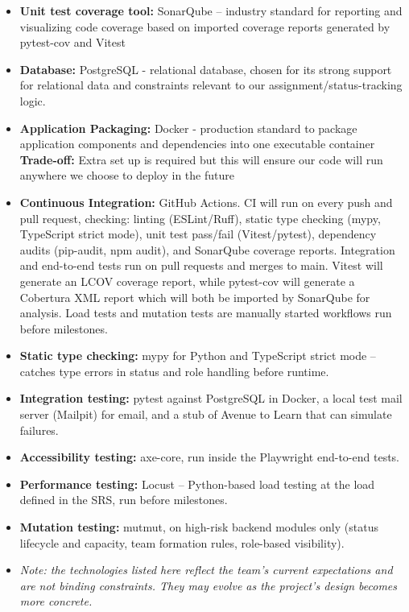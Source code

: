 \documentclass{article}
\begin{document}
\begin{itemize}
    \item \textbf{Unit test coverage tool:}  SonarQube -- industry standard for reporting and visualizing code coverage based on imported coverage reports generated by pytest-cov and Vitest
    \item \textbf{Database:} PostgreSQL - relational database, chosen for its strong support for relational data and constraints relevant to our assignment/status-tracking logic.
    \item \textbf{Application Packaging:} Docker - production standard to package application components and dependencies into one executable container \textbf{Trade-off:} Extra set up is required but this will ensure our code will run anywhere we choose to deploy in the future
    \item \textbf{Continuous Integration:} GitHub Actions. CI will run on every push and pull request, checking: linting (ESLint/Ruff), static type checking (mypy, TypeScript strict mode), unit test pass/fail (Vitest/pytest), dependency audits (pip-audit, npm audit), and SonarQube coverage reports. Integration and end-to-end tests run on pull requests and merges to main. Vitest will generate an LCOV coverage report, while pytest-cov will generate a Cobertura XML report which will both be imported by SonarQube for analysis. Load tests and mutation tests are manually started workflows run before milestones.
    \item \textbf{Static type checking:} mypy for Python and TypeScript strict mode -- catches type errors in status and role handling before runtime.
    \item \textbf{Integration testing:} pytest against PostgreSQL in Docker, a local test mail server (Mailpit) for email, and a stub of Avenue to Learn that can simulate failures.
    \item \textbf{Accessibility testing:} axe-core, run inside the Playwright end-to-end tests.
    \item \textbf{Performance testing:} Locust -- Python-based load testing at the load defined in the SRS, run before milestones.
    \item \textbf{Mutation testing:} mutmut, on high-risk backend modules only (status lifecycle and capacity, team formation rules, role-based visibility).    \item \textit{Note: the technologies listed here reflect the team's current expectations and are not binding constraints. They may evolve as the project's design becomes more concrete.}
\end{itemize}
\end{document}
